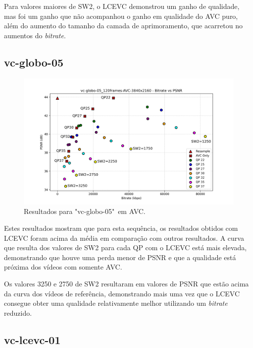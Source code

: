 Para valores maiores de SW2, o \acrshort{LCEVC} demonstrou um ganho de qualidade, mas foi
um ganho que não acompanhou o ganho em qualidade do \acrshort{AVC} puro, além do aumento
do tamanho da camada de aprimoramento, que acarretou no aumentos do \textit{bitrate}.

\newpage
\subsection{vc-globo-05}

\begin{figure}[h]
    \centering
    \includegraphics[width=1.0\textwidth]{img/vc-globo-05_120frames-AVC.png}
    \caption{Resultados para "vc-globo-05"\ em \acrshort{AVC}.}
    \label{fig:vc-globo-05}
\end{figure}

Estes resultados mostram que para esta sequência, os resultados obtidos com \acrshort{LCEVC}
foram acima da média em comparação com outros resultados. A curva que resulta dos valores
de SW2 para cada QP com o \acrshort{LCEVC} está mais elevada, demonstrando que houve uma perda
menor de \acrshort{PSNR} e que a qualidade está próxima dos vídeos com somente \acrshort{AVC}.

Os valores 3250 e 2750 de SW2 resultaram em valores de \acrshort{PSNR} que estão acima da curva
dos vídeos de referência, demonstrando mais uma vez que o \acrshort{LCEVC} consegue obter
uma qualidade relativamente melhor utilizando um \textit{bitrate} reduzido.

\newpage

\subsection{vc-lcevc-01}

